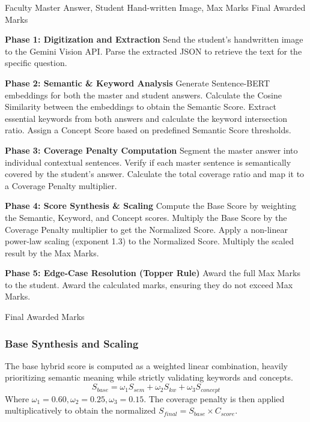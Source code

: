 \documentclass[conference]{IEEEtran}
\begin{document}
\begin{algorithm}[ht]
\caption{AutoGrade Hybrid Multi-Factor Evaluation}
\label{alg:evaluation}
\begin{algorithmic}[1]
\renewcommand{\algorithmicrequire}{\textbf{Input:}}
\renewcommand{\algorithmicensure}{\textbf{Output:}}
\REQUIRE Faculty Master Answer, Student Hand-written Image, Max Marks
\ENSURE Final Awarded Marks

\STATE \textbf{Phase 1: Digitization and Extraction}
\STATE Send the student's handwritten image to the Gemini Vision API.
\STATE Parse the extracted JSON to retrieve the text for the specific question.

\STATE \textbf{Phase 2: Semantic \& Keyword Analysis}
\STATE Generate Sentence-BERT embeddings for both the master and student answers.
\STATE Calculate the Cosine Similarity between the embeddings to obtain the Semantic Score.
\STATE Extract essential keywords from both answers and calculate the keyword intersection ratio.
\STATE Assign a Concept Score based on predefined Semantic Score thresholds.

\STATE \textbf{Phase 3: Coverage Penalty Computation}
\STATE Segment the master answer into individual contextual sentences.
\STATE Verify if each master sentence is semantically covered by the student's answer.
\STATE Calculate the total coverage ratio and map it to a Coverage Penalty multiplier.

\STATE \textbf{Phase 4: Score Synthesis \& Scaling}
\STATE Compute the Base Score by weighting the Semantic, Keyword, and Concept scores.
\STATE Multiply the Base Score by the Coverage Penalty multiplier to get the Normalized Score.
\STATE Apply a non-linear power-law scaling (exponent 1.3) to the Normalized Score.
\STATE Multiply the scaled result by the Max Marks.

\STATE \textbf{Phase 5: Edge-Case Resolution (Topper Rule)}
    \STATE Award the full Max Marks to the student.
\ELSE
    \STATE Award the calculated marks, ensuring they do not exceed Max Marks.
\ENDIF

\RETURN Final Awarded Marks
\end{algorithmic}
\end{algorithm}

\subsubsection{Base Synthesis and Scaling}
The base hybrid score is computed as a weighted linear combination, heavily prioritizing semantic meaning while strictly validating keywords and concepts.
\begin{equation}
S_{base} = \omega_1 S_{sem} + \omega_2 S_{kw} + \omega_3 S_{concept}
\end{equation}
Where $\omega_1 = 0.60, \omega_2 = 0.25, \omega_3 = 0.15$. The coverage penalty is then applied multiplicatively to obtain the normalized $S_{final} = S_{base} \times C_{score}$.
\end{document}
